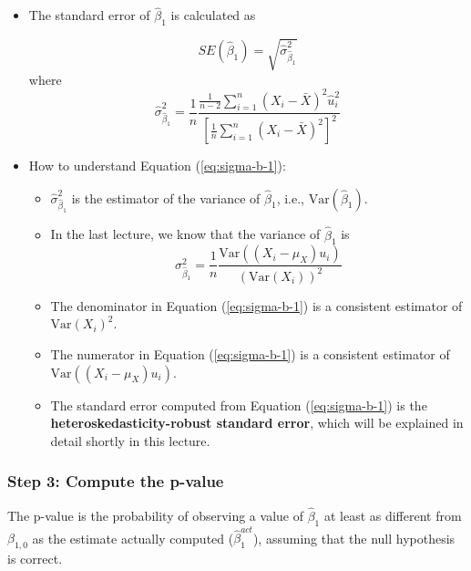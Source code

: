 \documentclass[a4paper,11pt]{article}
\newcommand{\var}{\mathrm{Var}}
\begin{document}
\begin{itemize}
\item The standard error of \(\hat{\beta}_1\) is calculated as
\label{sec:orgfcf6d7c}

\begin{equation}
\label{eq:se-b-1}
SE(\hat{\beta}_1) = \sqrt{\hat{\sigma}^2_{\hat{\beta}_1}}
\end{equation}
where
\begin{equation}
\label{eq:sigma-b-1}
\hat{\sigma}^2_{\hat{\beta}_1} = \frac{1}{n} \frac{\frac{1}{n-2} \sum_{i=1}^n (X_i - \bar{X})^2 \hat{u}^2_i}{\left[ \frac{1}{n} \sum_{i=1}^n (X_i - \bar{X})^2 \right]^2}
\end{equation}

\item How to understand Equation (\ref{eq:sigma-b-1}):
\label{sec:orgc485af9}

\begin{itemize}
\item \(\hat{\sigma}^2_{\hat{\beta}_1}\) is the estimator of the variance of
\(\hat{\beta}_1\), i.e., \(\mathrm{Var}(\hat{\beta}_1)\).

\item In the last lecture, we know that the variance of \(\hat{\beta}_1\) is
\[ \sigma^2_{\hat{\beta}_1} = \frac{1}{n} \frac{\var\left( (X_i - \mu_X)u_i \right)}{\left( \var(X_i) \right)^2} \]

\item The denominator in Equation (\ref{eq:sigma-b-1}) is a consistent
estimator of \(\var(X_i)^2\).

\item The numerator in Equation (\ref{eq:sigma-b-1}) is a consistent
estimator of \(\var((X_i - \mu_X)u_i)\).

\item The standard error computed from Equation (\ref{eq:sigma-b-1}) is
the \textbf{heteroskedasticity-robust standard error}, which will be
explained in detail shortly in this lecture.
\end{itemize}
\end{itemize}

\subsubsection*{Step 3: Compute the p-value}
\label{sec:orgc31b008}

The p-value is the probability of observing a value of \(\hat{\beta}_1\)
at least as different from \(\beta_{1,0}\) as the estimate actually
computed (\(\hat{\beta}^{act}_1\)), assuming that the null hypothesis is
correct.
\end{document}
